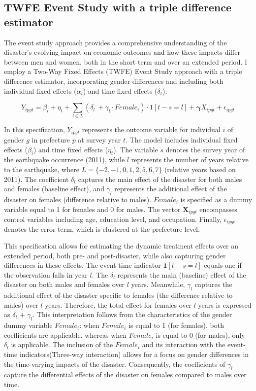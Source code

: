 \documentclass[a4paper,12pt]{article}
\begin{document}
\subsection{TWFE Event Study with a triple difference estimator}
The event study approach provides a comprehensive understanding of the disaster's evolving impact on economic outcomes and how these impacts differ between men and women, both in the short term and over an extended period. I employ a Two-Way Fixed Effects (TWFE) Event Study approach with a triple difference estimator, incorporating gender differences and including both individual fixed effects ($\alpha_i$) and time fixed effects ($\delta_t$):

\begin{equation}
Y_{ipgt} = \beta_i + \eta_t + \sum_{l \in L} (\delta_l\ + \gamma_l \cdot Female_i) \cdot 1[t-s = l] +  \mathbf \gamma {X}_{ipgt}+\epsilon_{ipgt}
\end{equation}

In this specification, $Y_{ipgt}$ represents the outcome variable for individual $i$ of gender $g$ in prefecture $p$ at survey year $t$. The model includes individual fixed effects ($\beta_i$) and time fixed effects ($\eta_t$). The variable $s$ denotes the survey year of the earthquake occurrence (2011), while $l$ represents the number of years relative to the earthquake, where $L = \{-2, -1, 0, 1, 2, 5, 6, 7\}$ (relative years based on 2011). The coefficient $\delta_l$ captures the main effect of the disaster for both males and females (baseline effect), and $\gamma_l$ represents the additional effect of the disaster on females (difference relative to males). $Female_i$ is specified as a dummy variable equal to 1 for females and 0 for males. The vector $\mathbf{X}_{ipgt}$ encompasses control variables including age, education level, and occupation. Finally, $\epsilon_{ipgt}$ denotes the error term, which is clustered at the prefecture level.


This specification allows for estimating the dynamic treatment effects over an extended period, both pre- and post-disaster, while also capturing gender differences in these effects. The event-time indicator $\mathbf{1}[t-s = l]$ equals one if the observation falls in year $l$. The $\delta_l$ represents the main (baseline) effect of the disaster on both males and females over $l$ years. Meanwhile, $\gamma_l$ captures the additional effect of the disaster specific to females (the difference relative to males) over $l$ years. Therefore, the total effect for females over $l$ years is expressed as $\delta_l$ + $\gamma_l$. This interpretation follows from the characteristics of the gender dummy variable $Female_i$: when $Female_i$ is equal to 1 (for females), both coefficients are applicable, whereas when $Female_i$ is equal to 0 (for males), only $\delta_l$ is applicable. The inclusion of the $Female_i$ and its interaction with the event-time indicators(Three-way interaction) allows for a focus on gender differences in the time-varying impacts of the disaster. Consequently, the coefficients of $\gamma_l$ capture the differential effects of the disaster on females compared to males over time.
\end{document}
